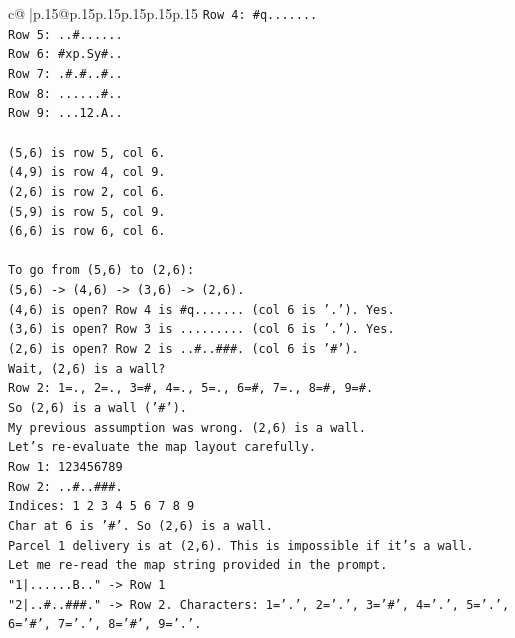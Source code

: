 \documentclass{article}
\begin{document}
{\begin{supertabular}{c@{$\;$}|p{.15\linewidth}@{}p{.15\linewidth}p{.15\linewidth}p{.15\linewidth}p{.15\linewidth}p{.15\linewidth}}
{{{\texttt{Row 4: \#q.......} \\
\texttt{Row 5: ..\#......} \\
\texttt{Row 6: \#xp.Sy\#..} \\
\texttt{Row 7: .\#.\#..\#..} \\
\texttt{Row 8: ......\#..} \\
\texttt{Row 9: ...12.A..} \\
\\ 
\texttt{(5,6) is row 5, col 6.} \\
\texttt{(4,9) is row 4, col 9.} \\
\texttt{(2,6) is row 2, col 6.} \\
\texttt{(5,9) is row 5, col 9.} \\
\texttt{(6,6) is row 6, col 6.} \\
\\ 
\texttt{To go from (5,6) to (2,6):} \\
\texttt{(5,6) {-}> (4,6) {-}> (3,6) {-}> (2,6).} \\
\texttt{(4,6) is open? Row 4 is \#q....... (col 6 is '.'). Yes.} \\
\texttt{(3,6) is open? Row 3 is ......... (col 6 is '.'). Yes.} \\
\texttt{(2,6) is open? Row 2 is ..\#..\#\#\#. (col 6 is '\#').} \\
\texttt{Wait, (2,6) is a wall?} \\
\texttt{Row 2: 1=., 2=., 3=\#, 4=., 5=., 6=\#, 7=., 8=\#, 9=\#.} \\
\texttt{So (2,6) is a wall ('\#').} \\
\texttt{My previous assumption was wrong. (2,6) is a wall.} \\
\texttt{Let's re{-}evaluate the map layout carefully.} \\
\texttt{Row 1: 123456789} \\
\texttt{Row 2: ..\#..\#\#\#.} \\
\texttt{Indices: 1 2 3 4 5 6 7 8 9} \\
\texttt{Char at 6 is '\#'. So (2,6) is a wall.} \\
\texttt{Parcel 1 delivery is at (2,6). This is impossible if it's a wall.} \\
\texttt{Let me re{-}read the map string provided in the prompt.} \\
\texttt{"1|......B.." {-}> Row 1} \\
\texttt{"2|..\#..\#\#\#." {-}> Row 2. Characters: 1='.', 2='.', 3='\#', 4='.', 5='.', 6='\#', 7='.', 8='\#', 9='.'.} \\
}}}
\end{supertabular}}
\end{document}
